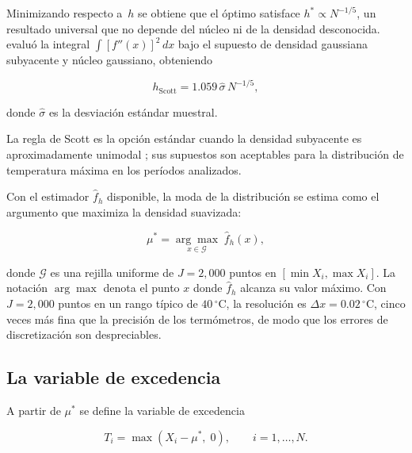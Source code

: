 \documentclass[APA,STIX1COL]{WileyNJD-v2}
\begin{document}
{\medskip

Minimizando respecto a~$h$ se obtiene que el \'optimo satisface
$h^*\propto N^{-1/5}$, un resultado universal que no depende del
n\'ucleo ni de la densidad desconocida. \citet{scott1992} evaluó
la integral $\int[f''(x)]^2\,dx$ bajo el supuesto de densidad
gaussiana subyacente y n\'ucleo gaussiano, obteniendo

\begin{equation}\label{eq:scott}
h_{\mathrm{Scott}} = 1.059\,\hat{\sigma}\,N^{-1/5},
\end{equation}

\medskip

donde $\hat{\sigma}$ es la desviaci\'on est\'andar muestral.

La regla de Scott es la opci\'on est\'andar cuando la densidad subyacente es aproximadamente unimodal
\citep{silverman1986}; sus supuestos son aceptables para la
distribuci\'on de temperatura m\'axima en los per\'iodos
analizados.

\medskip

Con el estimador $\hat{f}_h$ disponible, la moda de la distribuci\'on
se estima como el argumento que maximiza la densidad suavizada:

\begin{equation}\label{eq:mustar}
\mu^* = \underset{x\in\mathcal{G}}{\arg\max}\;\hat{f}_h(x),
\end{equation}

donde $\mathcal{G}$ es una rejilla uniforme de $J=2{,}000$ puntos
en $[\min X_i, \max X_i]$. La notaci\'on $\arg\max$ denota el punto $x$ donde $\hat{f}_h$ alcanza su valor m\'aximo. Con $J=2{,}000$ puntos
en un rango t\'ipico de $40\,{}^\circ\mathrm{C}$, la resoluci\'on
es $\Delta x=0.02\,{}^\circ\mathrm{C}$, cinco veces m\'as fina
que la precisi\'on de los term\'ometros, de modo que los errores
de discretizaci\'on son despreciables.

\subsection{La variable de excedencia}\label{subsec:excedencia}

A partir de $\mu^*$ se define la variable de excedencia

\begin{equation}\label{eq:Ti}
T_i = \max(X_i - \mu^*,\;0),\qquad i=1,\ldots,N.
\end{equation}

\medskip

}
\end{document}
